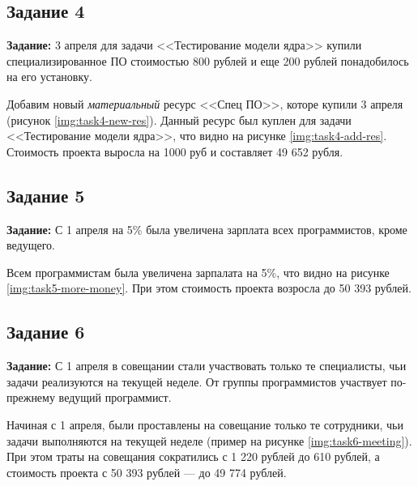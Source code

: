 

\clearpage
\subsection{Задание 4}

\textbf{Задание:} 3 апреля для задачи <<Тестирование модели ядра>> купили специализированное ПО стоимостью 800 рублей и еще 200 рублей понадобилось на его установку.

Добавим новый \textit{материальный} ресурс <<Спец ПО>>, которе купили 3 апреля (рисунок \ref{img:task4-new-res}). Данный ресурс был куплен для задачи <<Тестирование модели ядра>>, что видно на рисунке \ref{img:task4-add-res}. Стоимость проекта выросла на 1000 руб и составляет 49 652 рубля.



\clearpage
\subsection{Задание 5}

\textbf{Задание:} С 1 апреля на 5\% была увеличена зарплата всех программистов, кроме ведущего.

Всем программистам была увеличена зарпалата на 5\%, что видно на рисунке \ref{img:task5-more-money}. При этом стоимость проекта возросла до 50 393 рублей.



\clearpage
\subsection{Задание 6}

\textbf{Задание:} С 1 апреля в совещании стали участвовать только те специалисты, чьи задачи реализуются на текущей неделе. От группы программистов участвует по-прежнему ведущий программист.

Начиная с 1 апреля, были проставлены на совещание только те сотрудники, чьи задачи выполняются на текущей неделе (пример на рисунке \ref{img:task6-meeting}). При этом траты на совещания сократились с 1 220 рублей до 610 рублей, а стоимость проекта с 50 393 рублей --- до 49 774 рублей.

